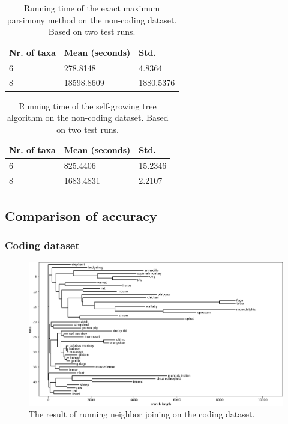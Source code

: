 \documentclass[11pt,twocolumn]{article}
\begin{document}
\begin{table}[H]
	\caption{Running time of the exact maximum parsimony method on the non-coding dataset. Based on two test runs.}
	\centering
	\begin{tabular}{lll}
		\toprule
		Nr. of taxa & Mean (seconds) & Std. \\
		\midrule
		6 & 278.8148 & 4.8364 \\
		8 & 18598.8609 & 1880.5376 \\
		\bottomrule
	\end{tabular}
\label{table:mp_noncoding}
\end{table}

\begin{table}[H]
	\caption{Running time of the self-growing tree algorithm on the non-coding dataset. Based on two test runs.}
	\centering
	\begin{tabular}{lll}
		\toprule
		Nr. of taxa & Mean (seconds) & Std. \\
		\midrule
		6 & 825.4406 & 15.2346 \\
		8 & 1683.4831 & 2.2107 \\
		\bottomrule
	\end{tabular}
\label{table:sota_noncoding}
\end{table}

\subsection{Comparison of accuracy}

\subsubsection{Coding dataset}

\begin{figure}
    \centering
    \includegraphics[width=\linewidth]{img/nj.png}
    \caption{The result of running neighbor joining on the coding dataset.}
    \label{fig:nj}
\end{figure}
\end{document}
